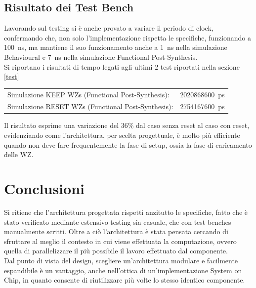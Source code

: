 \documentclass{article}
\begin{document}
\subsection{Risultato dei Test Bench}

Lavorando sul testing si è anche provato a variare il periodo di clock, confermando che, non solo l'implementazione rispetta le specifiche, funzionando a \SI{100}{\ns},
ma mantiene il suo funzionamento anche a \SI{1}{\ns} nella simulazione Behavioural e \SI{7}{\ns} nella simulazione Functional Post-Synthesis.\\

Si riportano i risultati di tempo legati agli ultimi 2 test riportati nella sezione \ref{test}\\

\begin{tabular}{ll}
Simulazione KEEP WZs (Functional Post-Synthesis): & \SI{2020868600}{\ps}\\
Simulazione RESET WZs (Functional Post-Synthesis): & \SI{2754167600}{\ps}\\
\end{tabular}

\bigskip
Il risultato esprime una variazione del 36\% dal caso senza reset al caso con reset, evidenziando come l'architettura, per scelta progettuale,
è molto più efficiente quando non deve fare frequentemente la fase di setup, ossia la fase di caricamento delle WZ.


\section{Conclusioni}

Si ritiene che l'architettura progettata rispetti anzitutto le specifiche, fatto che è stato verificato mediante estensivo testing sia casuale, che con test benches
manualmente scritti. Oltre a ciò l'architettura è stata pensata cercando di sfruttare al meglio il contesto in cui viene effettuata la computazione, ovvero quella
di parallelizzare il più possibile il lavoro effettuato dal componente.\\

Dal punto di vista del design, scegliere un'architettura modulare e facilmente espandibile è un vantaggio, anche nell'ottica di un'implementazione System on Chip,
in quanto consente di riutilizzare più volte lo stesso identico componente.

\end{document}
